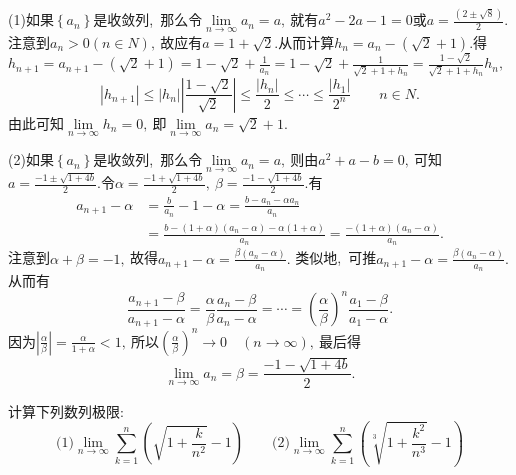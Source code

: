 	\begin{solution}
		(1)如果$\left\{a_n\right\}$是收敛列,\ 那么令$\lim\limits_{n\rightarrow\infty}a_n=a,\ $就有$a^2-2a-1=0$或$a=\frac{(2\pm\sqrt{8})}{2}.$注意到$a_n>0(n\in N),\ $故应有$a=1+\sqrt{2}.$从而计算$h_n=a_n-(\sqrt{2}+1).$得$h_{n+1}=a_{n+1}-(\sqrt{2}+1)=1-\sqrt{2}+\frac{1}{a_n}=1-\sqrt{2}+\frac{1}{\sqrt{2}+1+h_n}=\frac{1-\sqrt{2}}{\sqrt{2}+1+h_n}h_n,\ $
		$$\left|h_{n+1}\right|\le\left|h_n\right|\left|\frac{1-\sqrt{2}}{\sqrt{2}}\right|\le\frac{\left|h_n\right|}{2}\le\cdots\le\frac{\left|h_1\right|}{2^n}\qquad n\in N.$$
		由此可知$\lim\limits_{n\rightarrow\infty}h_n=0,\ $即$\lim\limits_{n\rightarrow\infty}a_n=\sqrt{2}+1.$
		
		(2)如果$\left\{a_n\right\}$是收敛列,\ 那么令$\lim\limits_{n\rightarrow\infty}a_n=a,\ $则由$a^2+a-b=0,\ $可知$a=\frac{-1\pm\sqrt{1+4b}}{2}.$令$\alpha=\frac{-1+\sqrt{1+4b}}{2},\ \beta=\frac{-1-\sqrt{1+4b}}{2}.$有
		\begin{align*}
			a_{n+1}-\alpha&=\frac{b}{a_n}-1-\alpha=\frac{b-a_n-\alpha a_n}{a_n}\\
			&=\frac{b-(1+\alpha)(a_n-\alpha)-\alpha(1+\alpha)}{a_n}=\frac{-(1+\alpha)(a_n-\alpha)}{a_n}.
		\end{align*}
		注意到$\alpha+\beta=-1,\ $故得$a_{n+1}-\alpha=\frac{\beta(a_n-\alpha)}{a_n}.$
		类似地,\ 可推$a_{n+1}-\alpha=\frac{\beta(a_n-\alpha)}{a_n}.$从而有
		$$\frac{a_{n+1}-\beta}{a_{n+1}-\alpha}=\frac{\alpha}{\beta}\frac{a_n-\beta}{a_n-\alpha}=\cdots=\left(\frac{\alpha}{\beta}\right)^n\frac{a_1-\beta}{a_1-\alpha}.$$
		因为$\left|\frac{\alpha}{\beta}\right|=\frac{\alpha}{1+\alpha}<1,\ $所以$\left(\frac{\alpha}{\beta}\right)^n\rightarrow0\quad(n\rightarrow\infty),\ $最后得
		$$\lim\limits_{n\rightarrow\infty}a_n=\beta=\frac{-1-\sqrt{1+4b}}{2}.$$ 
	\end{solution}
	\newpage
	\begin{problem}
		计算下列数列极限:
		$$\text{(1)}\lim\limits_{n\rightarrow\infty}\sum\limits_{k=1}^{n}\left(\sqrt{1+\frac{k}{n^2}}-1\right)\qquad\text{(2)}\lim\limits_{n\rightarrow\infty}\sum\limits_{k=1}^{n}\left(\sqrt[3]{1+\frac{k^2}{n^3}}-1\right)$$
	\end{problem}
	
